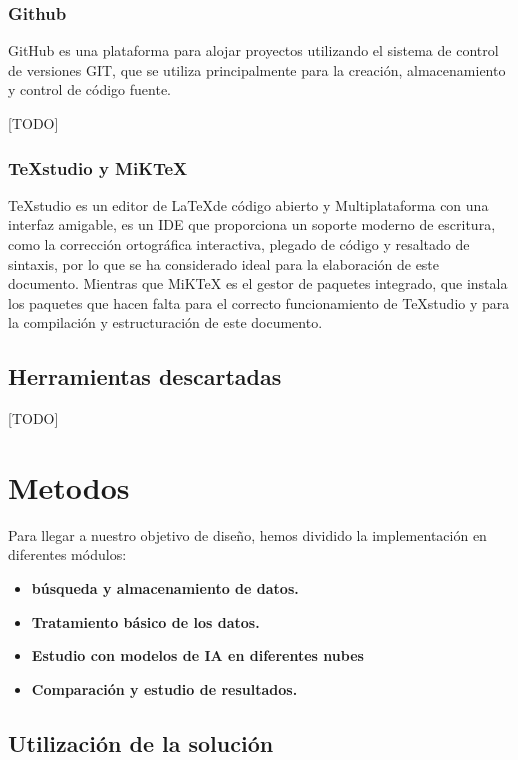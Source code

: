 \subsubsection*{Github}
GitHub es una plataforma para alojar proyectos utilizando el sistema de control de versiones GIT, que se utiliza principalmente para la creación, almacenamiento y control de código fuente.  

[TODO]

\subsubsection*{TeXstudio y MiKTeX}
TeXstudio es un editor de \LaTeX\space de código abierto y Multiplataforma con una interfaz amigable, es un IDE que proporciona un soporte moderno de escritura, como la corrección ortográfica interactiva, plegado de código y resaltado de sintaxis, por lo que se ha considerado ideal para la elaboración de este documento.
Mientras que MiKTeX es el gestor de paquetes integrado, que instala los paquetes que hacen falta para el correcto funcionamiento de TeXstudio y para la compilación y estructuración de este documento.

\subsection{Herramientas descartadas} 

[TODO]

\section{Metodos}

Para llegar a nuestro objetivo de diseño, hemos dividido la implementación en diferentes módulos:

\begin{itemize}
	\item \textbf{ búsqueda y almacenamiento de datos.}
	\item \textbf{ Tratamiento básico de los datos.}
	\item \textbf{ Estudio con modelos de IA en diferentes nubes}
	\item \textbf{ Comparación y estudio de resultados.}
\end{itemize}

\subsection{Utilización de la solución}

